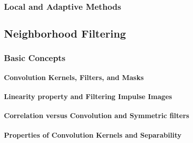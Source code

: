 \subsubsection{Local and Adaptive Methods} 
\label{booksection_24_Local_and_Adaptive_Methods}

\subsection{Neighborhood Filtering} 
\label{booksection_25_Neighborhood_Filtering}
\subsubsection{Basic Concepts} 
\label{booksection_26_Basic_Concepts}
\paragraph{Convolution Kernels, Filters, and Masks} 
\label{booksection_27_Convolution_Kernels_Filters_and_Masks}

\paragraph{Linearity property and Filtering Impulse Images} 
\label{booksection_28_Linearity_property_and_Filtering_Impulse_Images}

\paragraph{Correlation versus Convolution and Symmetric filters} 
\label{booksection_29_Correlation_versus_Convolution_and_Symmetric_filters}

\paragraph{Properties of Convolution Kernels and Separability} 
\label{booksection_30_Properties_of_Convolution_Kernels_and_Separability}

